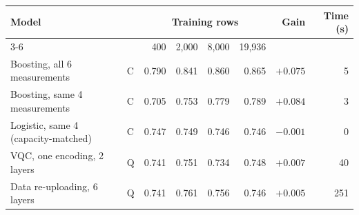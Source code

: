 \begin{tabular}{llrrrrrr}
\toprule
Model & & \multicolumn{4}{c}{Training rows} & Gain & Time (s) \\
\cmidrule(lr){3-6}
 & & 400 & 2,000 & 8,000 & 19,936 & & \\
\midrule
Boosting, all 6 measurements & C & 0.790 & 0.841 & 0.860 & 0.865 & $+0.075$ & 5 \\
Boosting, same 4 measurements & C & 0.705 & 0.753 & 0.779 & 0.789 & $+0.084$ & 3 \\
Logistic, same 4 (capacity-matched) & C & 0.747 & 0.749 & 0.746 & 0.746 & $-0.001$ & 0 \\
\midrule
VQC, one encoding, 2 layers & Q & 0.741 & 0.751 & 0.734 & 0.748 & $+0.007$ & 40 \\
Data re-uploading, 6 layers & Q & 0.741 & 0.761 & 0.756 & 0.746 & $+0.005$ & 251 \\
\bottomrule
\end{tabular}